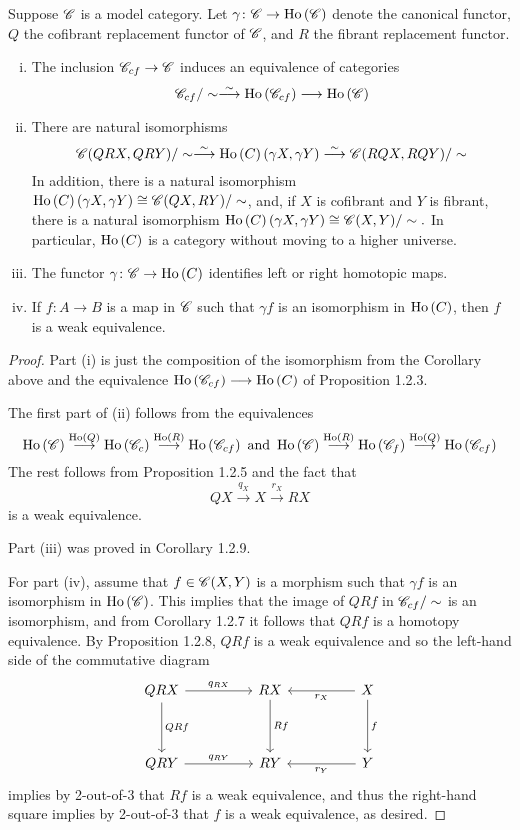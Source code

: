 \documentclass[10pt]{amsart}
\begin{document}
\begin{thm}
  Suppose $\mathscr{C}$ is a model category.
  Let $\gamma \colon \mathscr{C} \to \operatorname{Ho}\left(\mathscr{C}\right)$ denote the canonical functor, $Q$ the cofibrant replacement functor of $\mathscr{C}$, and $R$ the fibrant replacement functor.
  \begin{enumerate}[(i)]
  \item
    The inclusion $\mathscr{C}_{cf} \to \mathscr{C}$ induces an equivalence of categories
    $$\mathscr{C}_{cf}/\sim \overset{\sim}\longrightarrow \operatorname{Ho}\left(\mathscr{C}_{cf}\right) \longrightarrow \operatorname{Ho}\left(\mathscr{C}\right)$$
  \item
    There are natural isomorphisms
    $$\mathscr{C}(QRX, QRY)/\sim \overset{\sim}\longrightarrow \operatorname{Ho}\left(C\right)\left(\gamma X, \gamma Y\right) \overset{\sim}\longrightarrow \mathscr{C}(RQX, RQY)/\sim$$
    In addition, there is a natural isomorphism $\operatorname{Ho}\left(C\right)\left(\gamma X, \gamma Y\right) \cong \mathscr{C}(QX, RY)/\sim$, and, if $X$ is cofibrant and $Y$ is fibrant, there is a natural isomorphism $\operatorname{Ho}\left(C\right)\left(\gamma X, \gamma Y\right) \cong \mathscr{C}(X,Y)/\sim.$
    In particular, $\operatorname{Ho}\left(C\right)$ is a category without moving to a higher universe.
  \item
    The functor $\gamma \colon \mathscr{C} \to \operatorname{Ho}\left(C\right)$ identifies left or right homotopic maps.
  \item
    If $f \colon A \longrightarrow B$ is a map in $\mathscr{C}$ such that $\gamma f$ is an isomorphism in $\operatorname{Ho}\left(C\right)$, then $f$ is a weak equivalence.
  \end{enumerate}

  \begin{proof}
    Part (i) is just the composition of the isomorphism from the Corollary above and the equivalence $\operatorname{Ho}\left(\mathscr{C}_{cf}\right) \longrightarrow \operatorname{Ho}\left(C\right)$ of Proposition 1.2.3.
    
    The first part of (ii) follows from the equivalences
    $$\Ho{\C} \overset{\Ho{Q}}\longrightarrow \Ho{\C_c} \overset{\Ho{R}}\longrightarrow \Ho{\C_{cf}}\ \text{and}\ 
    \Ho{\C} \overset{\Ho{R}}\longrightarrow \Ho{\C_f} \overset{\Ho{Q}}\longrightarrow \Ho{\C_{cf}}$$
    The rest follows from Proposition 1.2.5 and the fact that
    $$QX \overset{q_X}\longrightarrow X \overset{r_X}\longrightarrow RX$$
    is a weak equivalence.

    Part (iii) was proved in Corollary 1.2.9.
    
    For part (iv), assume that $f \in \mathscr{C}(X,Y)$ is a morphism such that $\gamma f$ is an isomorphism in $\operatorname{Ho}\left(\mathscr{C}\right)$.
    This implies that the image of $QRf$ in $\mathscr{C}_{cf}/\sim$ is an isomorphism, and from Corollary 1.2.7 it follows that $QRf$ is a homotopy equivalence.
    By Proposition 1.2.8, $QRf$ is a weak equivalence and so the left-hand side of the commutative diagram
    $$\begin{tikzcd}
      QRX \arrow{rr}{q_{RX}}\arrow{dd}{QRf} && RX \arrow{dd}{Rf} && X \arrow{ll}{r_X}\arrow{dd}{f}\\
      \\
      QRY\arrow{rr}{q_{RY}} && RY && Y \arrow{ll}{r_Y}
    \end{tikzcd}$$
    implies by 2-out-of-3 that $Rf$ is a weak equivalence, and thus the right-hand square implies by 2-out-of-3 that $f$ is a weak equivalence, as desired.
  \end{proof}
\end{thm}
\end{document}
